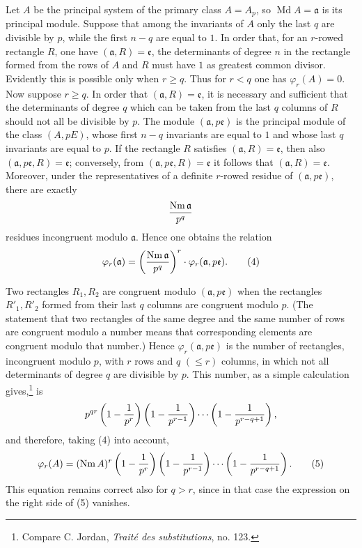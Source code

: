 \documentclass[11pt,a4paper]{article}
\newcommand{\Md}{\operatorname{Md}}
\newcommand{\Nm}{\operatorname{Nm}}
\begin{document}
Let $A$ be the principal system of the primary class $A=A_p$, so $\Md A=\mathfrak a$ is its principal module. Suppose that among the invariants of $A$ only the last $q$ are divisible by $p$, while the first $n-q$ are equal to $1$. In order that, for an $r$-rowed rectangle $R$, one have $(\mathfrak a,R)=\mathfrak e$, the determinants of degree $n$ in the rectangle formed from the rows of $A$ and $R$ must have $1$ as greatest common divisor. Evidently this is possible only when $r\ge q$. Thus for $r<q$ one has $\varphi_r(A)=0$. Now suppose $r\ge q$. In order that $(\mathfrak a,R)=\mathfrak e$, it is necessary and sufficient that the determinants of degree $q$ which can be taken from the last $q$ columns of $R$ should not all be divisible by $p$. The module $(\mathfrak a,p\mathfrak e)$ is the principal module of the class $(A,pE)$, whose first $n-q$ invariants are equal to $1$ and whose last $q$ invariants are equal to $p$. If the rectangle $R$ satisfies $(\mathfrak a,R)=\mathfrak e$, then also $(\mathfrak a,p\mathfrak e,R)=\mathfrak e$; conversely, from $(\mathfrak a,p\mathfrak e,R)=\mathfrak e$ it follows that $(\mathfrak a,R)=\mathfrak e$. Moreover, under the representatives of a definite $r$-rowed residue of $(\mathfrak a,p\mathfrak e)$, there are exactly
\[
 {\Nm\mathfrak a\over p^q}
\]
residues incongruent modulo $\mathfrak a$. Hence one obtains the relation
\begin{equation}
 \varphi_r(\mathfrak a)=\left({\Nm\mathfrak a\over p^q}\right)^r\cdot \varphi_r(\mathfrak a,p\mathfrak e).
\tag{4}
\end{equation}

Two rectangles $R_1,R_2$ are congruent modulo $(\mathfrak a,p\mathfrak e)$ when the rectangles $R'_1,R'_2$ formed from their last $q$ columns are congruent modulo $p$. (The statement that two rectangles of the same degree and the same number of rows are congruent modulo a number means that corresponding elements are congruent modulo that number.) Hence $\varphi_r(\mathfrak a,p\mathfrak e)$ is the number of rectangles, incongruent modulo $p$, with $r$ rows and $q$ $(\le r)$ columns, in which not all determinants of degree $q$ are divisible by $p$. This number, as a simple calculation gives,\footnote{Compare C. Jordan, \emph{Traité des substitutions}, no. 123.} is
\[
 p^{qr}\left(1-{1\over p^r}\right)
 \left(1-{1\over p^{r-1}}\right)
 \cdots
 \left(1-{1\over p^{r-q+1}}\right),
\]
and therefore, taking (4) into account,
\begin{equation}
 \varphi_r(A)=(\Nm A)^r
 \left(1-{1\over p^r}\right)
 \left(1-{1\over p^{r-1}}\right)
 \cdots
 \left(1-{1\over p^{r-q+1}}\right).
\tag{5}
\end{equation}
This equation remains correct also for $q>r$, since in that case the expression on the right side of (5) vanishes.
\end{document}

